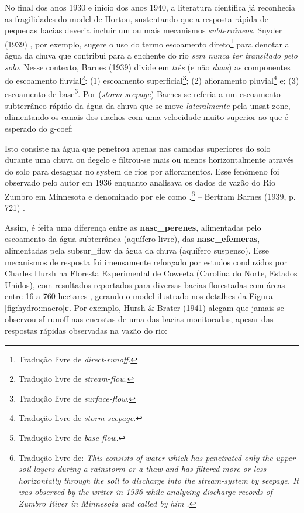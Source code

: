 \documentclass[./main.tex]{subfiles}
\begin{document}
\par No final dos anos 1930 e início dos anos 1940, a literatura científica já reconhecia as fragilidades do \gls{model} de Horton, sustentando que a resposta rápida de pequenas bacias deveria incluir um ou mais mecanismos \textit{subterrâneos}. Snyder (1939) \cite{Snyder1939}, por exemplo, sugere o uso do termo escoamento direto\footnote{Tradução livre de \textit{direct-runoff}.} para denotar a água da chuva que contribui para a enchente do rio \textit{sem nunca ter transitado pelo solo}. Nesse contexto, Barnes (1939) \cite{Barnes1939} divide em \textit{três} (e não \textit{duas}) as componentes do escoamento fluvial\footnote{Tradução livre de \textit{stream-flow}.}: (1) escoamento superficial\footnote{Tradução livre de \textit{surface-flow}.}; (2) afloramento pluvial\footnote{Tradução livre de \textit{storm-seepage}.} e; (3) escoamento de base\footnote{Tradução livre de \textit{base-flow}.}. Por  (\textit{storm-seepage}) Barnes se referia a um escoamento subterrâneo rápido da água da chuva que se move \textit{lateralmente} pela \gls{unsat-zone}, alimentando os canais dos riachos com uma velocidade muito superior ao que é esperado do \gls{g-coef}:

\begin{adjustwidth}{100pt}{0pt}
\medskip
\small Isto consiste na água que penetrou apenas nas camadas superiores do solo durante uma chuva ou degelo e filtrou-se mais ou menos horizontalmente através do solo para desaguar no \gls{system} de rios por afloramentos. Esse fenômeno foi observado pelo autor em 1936 enquanto analisava os dados de vazão do Rio Zumbro em Minnesota e denominado por ele como .\footnote{Tradução livre de: \textit{This consists of water which has penetrated only the upper soil-layers during a rainstorm or a thaw and has filtered more or less horizontally through the soil to discharge into the stream-system by seepage. It was observed by the writer in 1936 while analyzing discharge records of Zumbro River in Minnesota and called by him .}} -- Bertram Barnes (1939, p. 721) \cite{Barnes1939}.
\medskip
\end{adjustwidth}

\noindent Assim, é feita uma diferença entre as \textbf{\gls{nasc_perenes}}, alimentadas pelo escoamento da água subterrânea  (aquífero livre), das \textbf{\gls{nasc_efemeras}}, alimentadas pela \gls{subsur_flow} da água da chuva (aquífero suspenso). Esse mecanismos de resposta foi imensamente reforçado por estudos conduzidos por Charles Hursh na Floresta Experimental de Coweeta (Carolina do Norte, Estados Unidos), com resultados reportados para diversas bacias florestadas com áreas entre 16 a 760 hectares \cite{Hoover1943, Hursh1944}, gerando o \gls{model} ilustrado nos detalhes da Figura \ref{fig:hydro:macro}\textbf{c}. Por exemplo, Hursh \& Brater (1941) \cite{Hursh1941} alegam que jamais se observou \gls{sf-runoff} nas encostas de uma das bacias monitoradas, apesar das respostas rápidas observadas na vazão do rio: 
\end{document}
